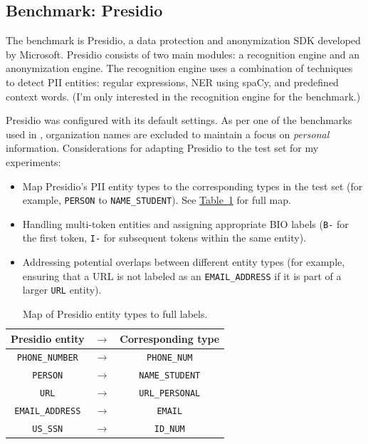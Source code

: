 \documentclass[11pt]{article}
\newcommand{\Tablink}[1]{\hyperref[#1]{Table~\ref*{#1}}}
\begin{document}
\subsection{Benchmark: Presidio}

The benchmark is Presidio, a data protection and anonymization SDK developed by Microsoft. Presidio \cite{Presidio} consists of two main modules: a recognition engine and an anonymization engine. The recognition engine uses a combination of techniques to detect PII entities: regular expressions, NER using spaCy, and predefined context words. (I'm only interested in the recognition engine for the benchmark.)

Presidio was configured with its default settings. As per one of the benchmarks used in \citealt{pilan-etal-2022-text}, organization names are excluded to maintain a focus on \textit{personal} information. Considerations for adapting Presidio to the test set for my experiments:

\begin{itemize}
  \item Map Presidio's PII entity types to the corresponding types in the test set (for example, \texttt{PERSON} to \texttt{NAME\_STUDENT}). See \Tablink{tab:entity_label_mapping} for full map.
  \item Handling multi-token entities and assigning appropriate BIO labels (\texttt{B-} for the first token, \texttt{I-} for subsequent tokens within the same entity).
  \item Addressing potential overlaps between different entity types (for example, ensuring that a URL is not labeled as an \texttt{EMAIL\_ADDRESS} if it is part of a larger \texttt{URL} entity).
\end{itemize}

\begin{table}[h!]
  \centering
  \caption{Map of Presidio entity types to full labels.}
  \label{tab:entity_label_mapping}
  \begin{tabular}{ccc}
    \toprule
    \textbf{Presidio entity} & \(\rightarrow\) & \textbf{Corresponding type} \\
    \midrule
    \texttt{PHONE\_NUMBER} & \(\rightarrow\) & \texttt{PHONE\_NUM} \\
    \texttt{PERSON} & \(\rightarrow\) & \texttt{NAME\_STUDENT} \\
    \texttt{URL} & \(\rightarrow\) & \texttt{URL\_PERSONAL} \\
    \texttt{EMAIL\_ADDRESS} & \(\rightarrow\) & \texttt{EMAIL} \\
    \texttt{US\_SSN} & \(\rightarrow\) & \texttt{ID\_NUM} \\
    \bottomrule
  \end{tabular}
\end{table}
\end{document}
